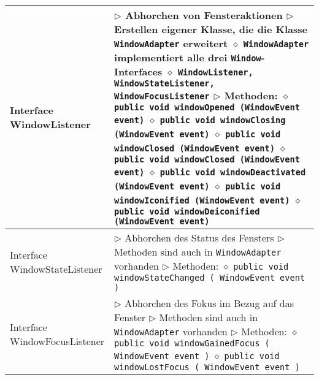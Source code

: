 \begin{longtable}{ | p{} p{} | }
	\makecell[l]{Interface \\ WindowListener} & \makecell[l]{
	$\rhd$ Abhorchen von Fensteraktionen \\
	$\rhd$ Erstellen eigener Klasse, die die Klasse \texttt{WindowAdapter} erweitert \\
	\hspace{0.4cm} $\diamond$ \texttt{WindowAdapter} implementiert alle drei \texttt{Window}-Interfaces \\
	\hspace{0.4cm} $\diamond$ \texttt{WindowListener, WindowStateListener, WindowFocusListener} \\
	$\rhd$ Methoden: \\
	\hspace{0.4cm} $\diamond$ \texttt{public void windowOpened (WindowEvent event)} \\
	\hspace{0.4cm} $\diamond$ \texttt{public void windowClosing (WindowEvent event)} \\
	\hspace{0.4cm} $\diamond$ \texttt{public void windowClosed (WindowEvent event)} \\
	\hspace{0.4cm} $\diamond$ \texttt{public void windowClosed (WindowEvent event)} \\
	\hspace{0.4cm} $\diamond$ \texttt{public void windowDeactivated (WindowEvent event)} \\
	\hspace{0.4cm} $\diamond$ \texttt{public void windowIconified (WindowEvent event)} \\
	\hspace{0.4cm} $\diamond$ \texttt{public void windowDeiconified (WindowEvent event)}} \\ \hline

	\makecell[l]{Interface \\ WindowStateListener} & \makecell[l]{
	$\rhd$ Abhorchen des Status des Fensters \\
	$\rhd$ Methoden sind auch in \texttt{WindowAdapter} vorhanden \\
	$\rhd$ Methoden: \\
	\hspace{0.4cm} $\diamond$ \texttt{public void windowStateChanged ( WindowEvent event )}} \\ \hline

	\makecell[l]{Interface \\ WindowFocusListener} & \makecell[l]{
	$\rhd$ Abhorchen des Fokus im Bezug auf das Fenster \\
	$\rhd$ Methoden sind auch in \texttt{WindowAdapter} vorhanden \\
	$\rhd$ Methoden: \\
	\hspace{0.4cm} $\diamond$ \texttt{public void windowGainedFocus ( WindowEvent event )} \\
	\hspace{0.4cm} $\diamond$ \texttt{public void windowLostFocus ( WindowEvent event )} } \\ \hline


\end{longtable}
